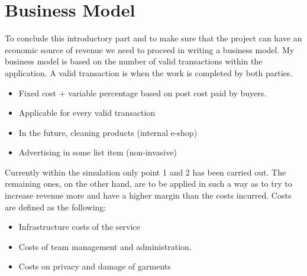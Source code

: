 \section{Business Model} \label{subsection:businessModel}
To conclude this introductory part and to make sure that the project can have an economic source of revenue we need to proceed in writing a business model. My business model is based on the number of valid transactions within the application.
A valid transaction is when the work is completed by both parties. 
\begin{itemize}
\item Fixed cost + variable percentage based on post cost paid by buyers.
\item Applicable for every valid transaction
\item In the future, cleaning products (internal e-shop)
\item Advertising in some list item (non-invasive)
\end{itemize}
Currently within the simulation only point 1 and 2 has been carried out. The remaining ones, on the other hand, are to be applied in such a way as to try to increase revenue more and have a higher margin than the costs incurred. Costs are defined as the following:
\begin{itemize}
\item Infrastructure costs of the service
\item Costs of team management and administration.
\item Costs on privacy and damage of garments
\end{itemize}